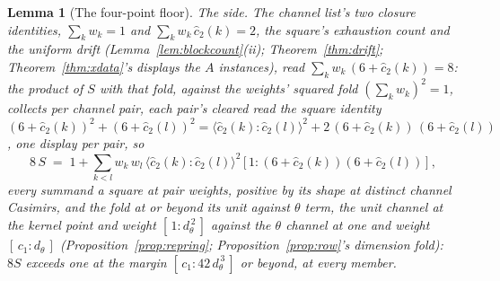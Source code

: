 \documentclass[11pt]{article}
\newtheorem{lemma}{Lemma}
\theoremstyle{definition}
\begin{document}
\begin{lemma}[The four-point floor]
\emph{The side.} The channel list's two closure identities,
$\sum_kw_k=1$ and $\sum_kw_k\,\hat c_2(k)=2$, the square's
exhaustion count and the uniform drift
(Lemma~\ref{lem:blockcount}(ii); Theorem~\ref{thm:drift};
Theorem~\ref{thm:xdata}'s displays the $A$ instances), read
$\sum_kw_k\,(6+\hat c_2(k))=8$: the product of $S$ with that
fold, against the weights' squared fold $(\sum_kw_k)^2=1$,
collects per channel pair, each pair's cleared read the square
identity
$(6+\hat c_2(k))^2+(6+\hat c_2(l))^2
=\langle\hat c_2(k)\!:\!\hat c_2(l)\rangle^2
+2\,(6+\hat c_2(k))\,(6+\hat c_2(l))$,
one display per pair, so
\[
8\,S\;=\;1+\sum_{k<l}w_k\,w_l\,
\big\langle\hat c_2(k):\hat c_2(l)\big\rangle^2\,
\big[\,1:(6+\hat c_2(k))(6+\hat c_2(l))\,\big]\ ,
\]
every summand a square at pair weights, positive by its shape at
distinct channel Casimirs, and the fold at or beyond its unit
against $\theta$ term, the unit channel at the kernel point and
weight $[\,1:d_\theta^{\,2}\,]$ against the $\theta$ channel at
one and weight $[\,c_1:d_\theta\,]$
(Proposition~\ref{prop:repring}; Proposition~\ref{prop:row}'s
dimension fold): $8S$ exceeds one at the margin
$[\,c_1:42\,d_\theta^{\,3}\,]$ or beyond, at every member.


\end{lemma}
\end{document}
